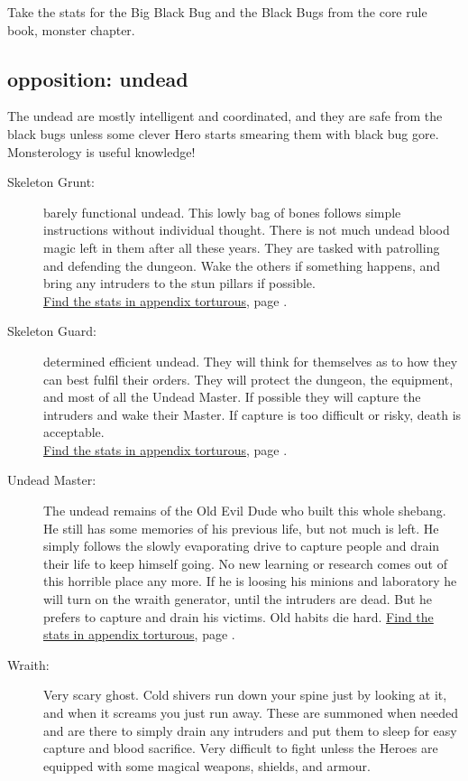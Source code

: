 \noindent Take the stats for the Big Black Bug and the Black Bugs from the core rule book, monster chapter.


\subsection*{opposition: undead}

The undead are mostly intelligent and coordinated, and they are safe from the black bugs unless some clever Hero starts smearing them with black bug gore. Monsterology is useful knowledge!

\begin{description}

\item[Skeleton Grunt:] barely functional undead. This lowly bag of bones follows simple instructions without individual thought. There is not much undead blood magic left in them after all these years. They are tasked with patrolling and defending the dungeon. Wake the others if something happens, and bring any intruders to the stun pillars if possible.\\
\hyperref[skeletongrunt]{Find the stats in appendix torturous}, page \pageref{skeletongrunt}.

\item[Skeleton Guard:] determined efficient undead. They will think for themselves as to how they can best fulfil their orders. They will protect the dungeon, the equipment, and most of all the Undead Master. If possible they will capture the intruders and wake their Master. If capture is too difficult or risky, death is acceptable.\\
\hyperref[skeletonguard]{Find the stats in appendix torturous}, page \pageref{skeletonguard}.

\item[Undead Master:] The undead remains of the Old Evil Dude who built this whole shebang. He still has some memories of his previous life, but not much is left. He simply follows the slowly evaporating drive to capture people and drain their life to keep himself going. No new learning or research comes out of this horrible place any more. If he is loosing his minions and laboratory he will turn on the wraith generator, until the intruders are dead. But he prefers to capture and drain his victims. Old habits die hard.
\hyperref[skeletonmaster]{Find the stats in appendix torturous}, page \pageref{skeletonmaster}.

\item[Wraith:] Very scary ghost. Cold shivers run down your spine just by looking at it, and when it screams you just run away. These are summoned when needed and are there to simply drain any intruders and put them to sleep for easy capture and blood sacrifice. Very difficult to fight unless the Heroes are equipped with some magical weapons, shields, and armour.

\end{description}

